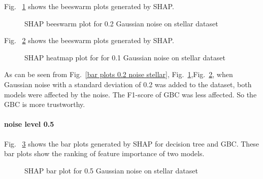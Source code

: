 \documentclass[runningheads,a4paper]{llncs}
\begin{document}
Fig. ~\ref{bee plots 0.2 noise stellar} shows the beeswarm plots generated by SHAP.
\begin{figure}[H]
	\centering
	
	\hfill
	
	
	\caption{SHAP beeswarm plot for 0.2 Gaussian noise on stellar dataset}
	\label{bee plots 0.2 noise stellar}
	
\end{figure}
Fig. ~\ref{heat plots 0.2 noise stellar} shows the beeswarm plots generated by SHAP.
\begin{figure}[H]
	\centering
	
	\hfill
	
	
	\caption{SHAP heatmap plot for for 0.1 Gaussian noise  on stellar dataset}
	\label{heat plots 0.2 noise stellar}
	
\end{figure}


As can be seen from Fig.~\ref{bar plots 0.2 noise stellar}, Fig.~\ref{bee plots 0.2 noise stellar},Fig.~\ref{heat plots 0.2 noise stellar}, when Gaussian noise with a standard deviation of 0.2 was added to the dataset, both models were affected by the noise. The F1-score of GBC was less affected. So the GBC is more trustworthy.

\paragraph{noise level 0.5}
Fig. ~\ref{bar plots 0.5 noise stellar} shows the bar plots generated by SHAP for decision tree and GBC. These bar plots show the ranking of feature importance of two models.
\begin{figure}[H]
	\centering
	
	\hfill
	
	
	\caption{SHAP bar plot for 0.5 Gaussian noise on stellar dataset}
	\label{bar plots 0.5 noise stellar}
\end{figure}
\end{document}
